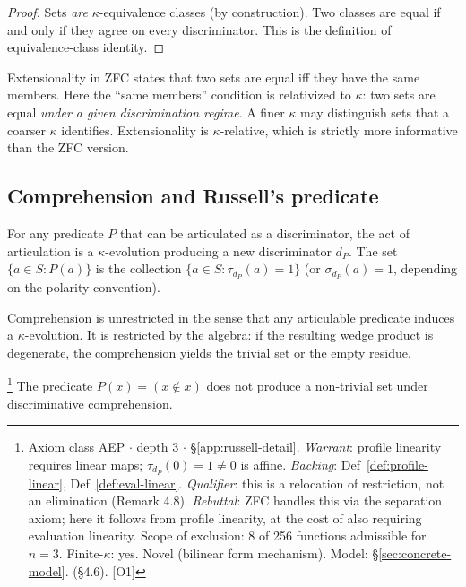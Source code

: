 \begin{proof}
Sets \emph{are} $\kappa$-equivalence classes (by construction).
Two classes are equal if and only if they agree on every discriminator.
This is the definition of equivalence-class identity.
\end{proof}

\begin{remark}
Extensionality in ZFC states that two sets are equal iff they have the
same members. Here the ``same members'' condition is relativized to
$\kappa$: two sets are equal \emph{under a given discrimination regime}.
A finer $\kappa$ may distinguish sets that a coarser $\kappa$ identifies.
Extensionality is $\kappa$-relative, which is strictly more informative
than the ZFC version.
\end{remark}

\subsection{Comprehension and Russell's predicate}

\begin{definition}\label{def:comprehension}
For any predicate $P$ that can be articulated as a discriminator,
the act of articulation is a $\kappa$-evolution producing a new
discriminator $d_P$. The set $\{a \in S : P(a)\}$ is the collection
$\{a \in S : \tau_{d_P}(a) = 1\}$ (or $\sigma_{d_P}(a) = 1$,
depending on the polarity convention).

Comprehension is unrestricted in the sense that any articulable
predicate induces a $\kappa$-evolution. It is restricted by the
algebra: if the resulting wedge product is degenerate, the
comprehension yields the trivial set or the empty residue.
\end{definition}

\begin{theorem}\label{thm:russell}\footnote{Axiom class \textsf{AEP} $\cdot$ depth 3 $\cdot$ \S\ref{app:russell-detail}.  \emph{Warrant}: profile linearity requires linear maps; $\tau_{{d_P}}(0) = 1 \neq 0$ is affine. \emph{Backing}: Def~\ref{def:profile-linear}, Def~\ref{def:eval-linear}. \emph{Qualifier}: this is a relocation of restriction, not an elimination (Remark 4.8). \emph{Rebuttal}: ZFC handles this via the separation axiom; here it follows from profile linearity, at the cost of also requiring evaluation linearity. Scope of exclusion: 8 of 256 functions admissible for $n=3$. Finite-$\kappa$: yes. Novel (bilinear form mechanism). Model: \S\ref{sec:concrete-model}. (\S4.6). [O1]}
The predicate $P(x) = (x \notin x)$ does not produce a non-trivial
set under discriminative comprehension.
\end{theorem}

